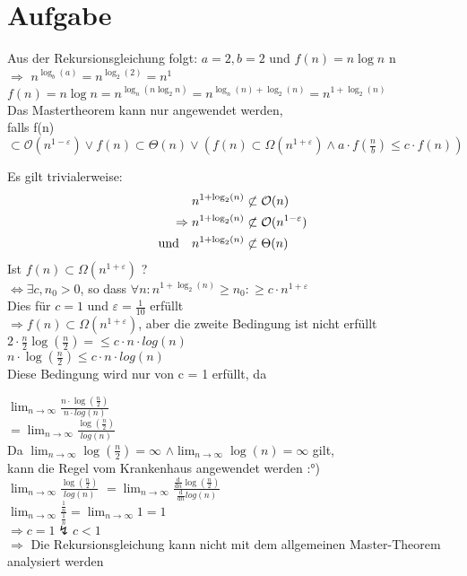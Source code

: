 \documentclass{article}
\newcounter{AufgabenCounter}
\newcounter{TeilaufgabenCounter}
\newenvironment{aufgabe}{\section*{Aufgabe \theAufgabenCounter}\setcounter{TeilaufgabenCounter}{1}}{\stepcounter{AufgabenCounter}}
\begin{document}
\begin{aufgabe}
  Aus der Rekursionsgleichung folgt: $a = 2,  b = 2 $ und $f(n) = n\log n$ n\\
  $\Rightarrow $ $n^{\log_b(a)} = n^{\log_2(2)} = n^1$ \\
  $f(n) = n\log n = n^{\log_n(n\log_2n)} = n^{\log_n(n)+\log_2(n)} = n^{1+\log_2(n)}$ \\
  Das Mastertheorem kann nur angewendet werden, \\
  falls f(n) $\subset\mathcal{O}(n^{1- \varepsilon }) \lor f(n) \subset \Theta(n)
    \lor (f(n) \subset \Omega(n^{1+\varepsilon}) \land a\cdot f(\frac{n}{b}) \leq c \cdot f(n))   $

  Es gilt trivialerweise:
  $$
    \begin{aligned}
      n^{1 + \log_2(n)}                 & \not\subset\mathcal{O}(n)                    \\
      \Rightarrow n^{1 + \log_2(n)}     & \not\subset\mathcal{O}(n^{1- \varepsilon } ) \\
      \text{und\quad }n^{1 + \log_2(n)} & \not\subset \Theta(n)
    \end{aligned}
  $$
  Ist $f(n) \subset \Omega(n^{1+\varepsilon})$ ? \\
  $\iff \exists c, n_0 >0$, so dass $\forall n: n^{1+\log_2(n)} \ge n_0: \geq c \cdot n^{1+\varepsilon} $ \\
  Dies für $ c = 1 $ und $ \varepsilon = \frac{1}{10}$ erfüllt \\
  $ \Rightarrow f(n) \subset \Omega(n^{1+\varepsilon}) $, aber die zweite Bedingung ist nicht erfüllt\\
  $2 \cdot \frac{n}{2} \log(\frac{n}{2})= \leq c \cdot n \cdot log (n)  $ \\
  $n \cdot \log(\frac{n}{2}) \leq c \cdot n \cdot log (n)  $ \\
  Diese Bedingung wird nur von c = 1 erfüllt, da

  $ \displaystyle \lim_{n \rightarrow \infty} \frac{n \cdot \log(\frac{n}{2})}{n \cdot log (n)}$ \\
  $ = \displaystyle \lim_{n \rightarrow \infty} \frac{\log(\frac{n}{2})}{log (n)}$ \\
  Da $\displaystyle \lim_{n \rightarrow \infty} \log(\frac{n}{2}) = \infty$
  $ \land \displaystyle \lim_{n \rightarrow \infty} \log(n) = \infty$ gilt, \\
  kann die Regel vom Krankenhaus angewendet werden :°) \\
  $\displaystyle \lim_{n \rightarrow \infty} \frac{\log(\frac{n}{2})}{log (n)} $
  $ = \displaystyle \lim_{n \rightarrow \infty} \frac{ \frac{\mathrm{d} }{\mathrm{d}n} \log(\frac{n}{2})}{ \frac{\mathrm{d} }{\mathrm{d}n}log (n)}$\\
  $\displaystyle \lim_{n \rightarrow \infty} \frac{\frac{1}{n}}{\frac{1}{n}} = \displaystyle \lim_{n \rightarrow \infty} 1 = 1 $\\
  $\Rightarrow c = 1 \lightning c < 1  $ \\
  $\Rightarrow$ Die Rekursionsgleichung kann nicht mit dem allgemeinen Master-Theorem analysiert werden
\end{aufgabe}
\end{document}
